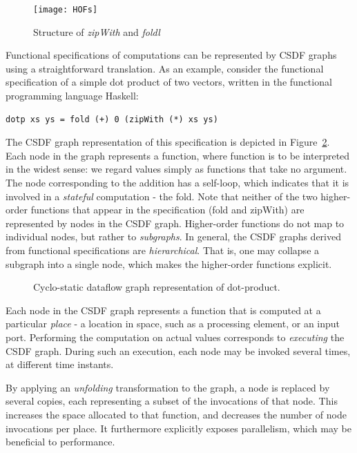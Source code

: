 \makeatother\documentclass[10pt,english,oneside,twocolumn,a4paper]{article}%
\begin{document}
  \begin{figure}[h!]
    \centering
    \texttt{[image: HOFs]}
    \caption{Structure of \emph{zipWith} and \emph{foldl}}
    \label{fig:zipwthandfoldlstruct}
  \end{figure}

  Functional specifications of computations can be represented by CSDF graphs using a straightforward translation.
  As an example, consider the functional specification of a simple dot product of two vectors, written in the functional programming language Haskell:

\begin{verbatim}
dotp xs ys = fold (+) 0 (zipWith (*) xs ys)  
\end{verbatim}

  The CSDF graph representation of this specification is depicted in Figure~\ref{fig:csdf-dotproduct}.
  Each node in the graph represents a function, where function is to be interpreted in the widest sense: we regard values simply as functions that take no argument.
  The node corresponding to the addition has a self-loop, which indicates that it is involved in a \emph{stateful} computation - the fold.
  Note that neither of the two higher-order functions that appear in the specification (fold and zipWith) are represented by nodes in the CSDF graph.
  Higher-order functions do not map to individual nodes, but rather to \emph{subgraphs}.
  In general, the CSDF graphs derived from functional specifications are \emph{hierarchical}.
  That is, one may collapse a subgraph into a single node, which makes the higher-order functions explicit.

  \begin{figure}[h!]
    \centering
    
    \caption{Cyclo-static dataflow graph representation of dot-product.}
    \label{fig:csdf-dotproduct}
  \end{figure}

  Each node in the CSDF graph represents a function that is computed at a particular \emph{place} - a location in space, such as a processing element, or an input port.
  Performing the computation on actual values corresponds to \emph{executing} the CSDF graph.
  During such an execution, each node may be invoked several times, at different time instants.

  By applying an \emph{unfolding} transformation to the graph, a node is replaced by several copies, each representing a subset of the invocations of that node.
  This increases the space allocated to that function, and decreases the number of node invocations per place.
  It furthermore explicitly exposes parallelism, which may be beneficial to performance.
  
\end{document}
